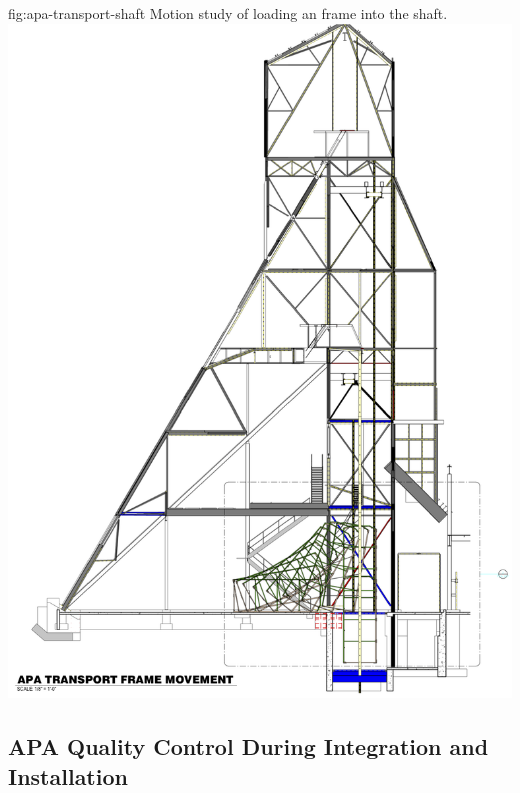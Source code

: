 \begin{dunefigure}{fig:apa-transport-shaft}
{Motion study of loading an  frame into the shaft.}  
\includegraphics[height=0.9\textheight,trim = 0mm 0mm 0mm 0mm, clip]{graphics/sp-apa-transport-shaft.png} 
\end{dunefigure}

\subsection{APA Quality Control During Integration and Installation} 
\label{sec:fdsp-apa-transport-qc}

